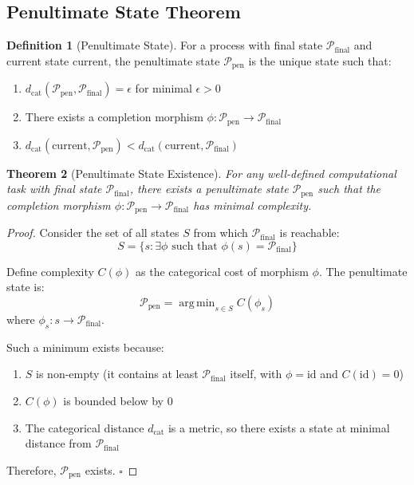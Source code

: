 \documentclass[twocolumn,10pt]{article}
\newtheorem{theorem}{Theorem}[section]
\theoremstyle{definition}
\newtheorem{definition}[theorem]{Definition}
\theoremstyle{remark}
\newcommand{\pentstate}{\mathcal{P}_{\text{pen}}}
\newcommand{\finalstate}{\mathcal{P}_{\text{final}}}
\newcommand{\dcat}{d_{\text{cat}}}
\DeclareMathOperator*{\argmin}{arg\,min}
\begin{document}
\subsection{Penultimate State Theorem}

\begin{definition}[Penultimate State]
For a process with final state $\finalstate$ and current state $\text{current}$, the penultimate state $\pentstate$ is the unique state such that:
\begin{enumerate}
    \item $\dcat(\pentstate, \finalstate) = \epsilon$ for minimal $\epsilon > 0$
    \item There exists a completion morphism $\phi: \pentstate \to \finalstate$
    \item $\dcat(\text{current}, \pentstate) < \dcat(\text{current}, \finalstate)$
\end{enumerate}
\end{definition}

\begin{theorem}[Penultimate State Existence]
\label{thm:penultimate_exists}
For any well-defined computational task with final state $\finalstate$, there exists a penultimate state $\pentstate$ such that the completion morphism $\phi: \pentstate \to \finalstate$ has minimal complexity.
\end{theorem}

\begin{proof}
Consider the set of all states $S$ from which $\finalstate$ is reachable:
\begin{equation}
    S = \{s : \exists \phi \text{ such that } \phi(s) = \finalstate\}
\end{equation}

Define complexity $C(\phi)$ as the categorical cost of morphism $\phi$. The penultimate state is:
\begin{equation}
    \pentstate = \argmin_{s \in S} C(\phi_s)
\end{equation}
where $\phi_s: s \to \finalstate$.

Such a minimum exists because:
\begin{enumerate}
    \item $S$ is non-empty (it contains at least $\finalstate$ itself, with $\phi = \text{id}$ and $C(\text{id}) = 0$)
    \item $C(\phi)$ is bounded below by 0
    \item The categorical distance $\dcat$ is a metric, so there exists a state at minimal distance from $\finalstate$
\end{enumerate}

Therefore, $\pentstate$ exists. $\square$
\end{proof}
\end{document}
